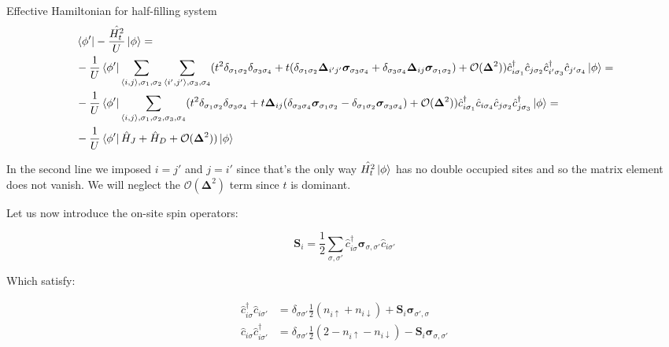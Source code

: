 \begin{section}{Effective Hamiltonian for half-filling system}
\begin{align*}
&\bra{\phi'} -\frac{\hat{H_t^2}}{U} \ket{\phi} = \\
&-\frac{1}{U} \bra{\phi'} \sum_{\langle i,j \rangle, \sigma_1, \sigma_2} \sum_{\langle i',j' \rangle, 					\sigma_3, \sigma_4} (t^2 \delta_{\sigma_1 \sigma_2}\delta_{\sigma_3 \sigma_4} + t(\delta_{\sigma_1 \sigma_2}		\boldsymbol{\Delta}_{i'j'}\boldsymbol{\sigma}_{\sigma_3 \sigma_4} + \delta_{\sigma_3 \sigma_4}						\boldsymbol{\Delta}_{ij}\boldsymbol{\sigma}_{\sigma_1 \sigma_2}) + \mathcal{O}(\boldsymbol{\Delta}^2)) 				\hat{c}_{i\sigma_1}^\dagger \hat{c}_{j \sigma_2} \hat{c}_{i' \sigma_3}^\dagger \hat{c}_{j'\sigma_4}					\ket{\phi} = \\
&-\frac{1}{U} \bra{\phi'} \sum_{\langle i,j \rangle, \sigma_1, \sigma_2, \sigma_3, \sigma_4} (t^2 						\delta_{\sigma_1 \sigma_2}\delta_{\sigma_3 \sigma_4} + t\boldsymbol{\Delta}_{ij}(\delta_{\sigma_3 \sigma_4}			\boldsymbol{\sigma}_{\sigma_1 \sigma_2} - \delta_{\sigma_1 \sigma_2} \boldsymbol{\sigma}_{\sigma_3 					\sigma_4}) + \mathcal{O}(\boldsymbol{\Delta}^2)) \hat{c}_{i\sigma_1}^\dagger \hat{c}_{i\sigma_4} \hat{c}_{j 		\sigma_2} \hat{c}_{j \sigma_3}^\dagger \ket{\phi} = \\
&-\frac{1}{U} \bra{\phi'} \hat{H}_J + \hat{H}_D + \mathcal{O}(\boldsymbol{\Delta}^2))\ket{\phi}
\end{align*}

In the second line we imposed $i=j'$ and $j=i'$ since that's the only way $\hat{H_t^2}\ket{\phi}$ has no double occupied sites and so the matrix element does not vanish. We will neglect the $\mathcal{O}(\boldsymbol{\Delta}^2)$ term since $t$ is dominant.

Let us now introduce the on-site spin operators:

\begin{equation}
\boldsymbol{S}_i = \frac{1}{2} \sum_{\sigma, \sigma'} \hat{c}_{i \sigma}^\dagger \boldsymbol{\sigma}_{\sigma, \sigma'} \hat{c}_{i \sigma'}
\end{equation}

Which satisfy:

\begin{align*}
\hat{c}_{i \sigma}^\dagger \hat{c}_{i \sigma'} &= \delta_{\sigma \sigma'} \frac{1}{2} (n_{i \uparrow} + n_{i \downarrow}) + \boldsymbol{S}_i\boldsymbol{\sigma}_{\sigma', \sigma} \\ 
\hat{c}_{i \sigma} \hat{c}_{i \sigma'}^\dagger &= \delta_{\sigma \sigma'} \frac{1}{2} (2 - n_{i \uparrow} - n_{i \downarrow}) - \boldsymbol{S}_i\boldsymbol{\sigma}_{\sigma, \sigma'} 
\end{align*}


\end{section}
